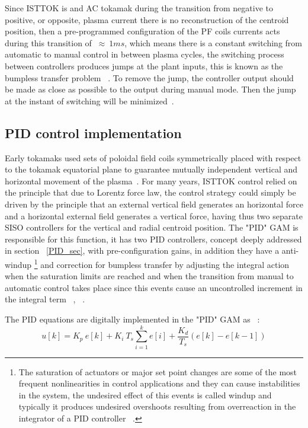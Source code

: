 Since ISTTOK is and AC tokamak during the transition from negative to positive, or opposite, plasma current there is no reconstruction of the centroid position, then a pre-programmed configuration of the  PF coils currents acts during this transition of $~\approx~1ms$, which means there is a constant switching from automatic to manual control in between plasma cycles, the switching process between controllers produces jumps at the plant inputs, this is known as the bumpless transfer problem ~\cite[Chapter~8]{Hippe2011}. To remove the jump, the controller output  should be made as close as possible to the output during manual mode. Then the jump at the instant of switching will be minimized~\cite{Vrancic1996}.   

\subsection{PID control implementation}

Early tokamaks used sets of poloidal field coils symmetrically placed with respect to the tokamak equatorial plane to guarantee mutually independent vertical and horizontal movement of the plasma~\cite[Chapter~1]{PirontiBook}.  For many years, ISTTOK control relied on the principle that due to Lorentz force law, the control strategy could simply be driven by the principle that an external vertical field  generates an horizontal force and a horizontal external field generates a vertical force, having thus two separate SISO controllers for the vertical and radial centroid position. The "PID" GAM is responsible for this function, it has two PID  controllers, concept deeply addressed in section ~\ref{PID_sec},   with pre-configuration gains, in addition they have a   anti-windup \footnote{The saturation of actuators or major set point changes are some  of the most frequent nonlinearities in control applications and they can cause instabilities in the system, the undesired effect of this events is called windup and typically it produces undesired overshoots resulting from overreaction in the integrator of a PID controller ~\cite[Chapter~1]{Hippe2011}.} and correction for bumpless transfer by adjusting the integral action when the saturation limits are reached and  when the transition from manual to automatic control takes place since this events cause an uncontrolled increment in the integral term  ~\cite[Chapter~3]{Yu2011}, ~\cite{Vrancic1996}. \smallskip  

The PID equations are digitally implemented in the "PID" GAM as ~\cite[Chapter~1]{Yu2011}: 
\begin{equation}
	u[k]=K_p~e[k]+ K_i~T_s\sum_{i=1}^{k}e[i]+\frac{K_d}{T_s}(e[k]-e[k-1])
\end{equation}


